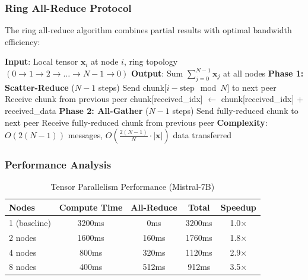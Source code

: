 \documentclass[11pt,a4paper]{article}
\newcommand{\vect}[1]{\mathbf{#1}}
\begin{document}
\subsubsection{Ring All-Reduce Protocol}

The ring all-reduce algorithm combines partial results with optimal bandwidth efficiency:

\begin{algorithm}[H]
\caption{Ring All-Reduce for Tensor Aggregation}
\begin{algorithmic}[1]
\STATE \textbf{Input}: Local tensor $\vect{x}_i$ at node $i$, ring topology $(0 \rightarrow 1 \rightarrow 2 \rightarrow \ldots \rightarrow N-1 \rightarrow 0)$
\STATE \textbf{Output}: Sum $\sum_{j=0}^{N-1} \vect{x}_j$ at all nodes
\STATE
\STATE \textbf{Phase 1: Scatter-Reduce} ($N-1$ steps)
    \STATE Send chunk[$i - \text{step} \mod N$] to next peer
    \STATE Receive chunk from previous peer
    \STATE chunk[received\_idx] $\gets$ chunk[received\_idx] + received\_data
\ENDFOR
\STATE
\STATE \textbf{Phase 2: All-Gather} ($N-1$ steps)
    \STATE Send fully-reduced chunk to next peer
    \STATE Receive fully-reduced chunk from previous peer
\ENDFOR
\STATE
\STATE \textbf{Complexity}: $O(2(N-1))$ messages, $O(\frac{2(N-1)}{N} \cdot |\vect{x}|)$ data transferred
\end{algorithmic}
\end{algorithm}

\subsubsection{Performance Analysis}

\begin{table}[H]
\centering
\caption{Tensor Parallelism Performance (Mistral-7B)}
\begin{tabular}{|l|c|c|c|c|}
\hline
\textbf{Nodes} & \textbf{Compute Time} & \textbf{All-Reduce} & \textbf{Total} & \textbf{Speedup} \\
\hline
1 (baseline) & 3200ms & 0ms & 3200ms & 1.0$\times$ \\
2 nodes & 1600ms & 160ms & 1760ms & 1.8$\times$ \\
4 nodes & 800ms & 320ms & 1120ms & 2.9$\times$ \\
8 nodes & 400ms & 512ms & 912ms & 3.5$\times$ \\
\hline
\end{tabular}
\end{table}
\end{document}
